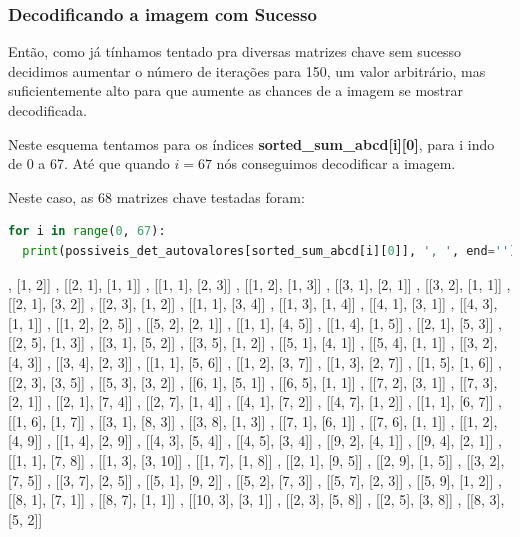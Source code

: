 \documentclass[a4paper, 12pt]{article}
\begin{document}
\subsubsection{Decodificando a imagem com Sucesso}

Então, como já tínhamos tentado pra diversas matrizes chave sem sucesso decidimos aumentar o número de iterações para 150, um valor arbitrário, mas suficientemente alto para que aumente as chances de a imagem se mostrar decodificada.

Neste esquema tentamos para os índices \textbf{sorted\_sum\_abcd[i][0]}, para i indo de 0 a 67. Até que quando $i=67$ nós conseguimos decodificar a imagem.

Neste caso, as 68 matrizes chave testadas foram:

\begin{lstlisting}[language=Python, caption = chamada do algorítimo de Arnold.]
for i in range(0, 67):
  print(possiveis_det_autovalores[sorted_sum_abcd[i][0]], ', ', end='')
\end{lstlisting}

\begin{footnotesize}
[[1, 1], [1, 2]] , [[2, 1], [1, 1]] , [[1, 1], [2, 3]] , [[1, 2], [1, 3]] , [[3, 1], [2, 1]] , [[3, 2], [1, 1]] , [[2, 1], [3, 2]] , [[2, 3], [1, 2]] , [[1, 1], [3, 4]] , [[1, 3], [1, 4]] , [[4, 1], [3, 1]] , [[4, 3], [1, 1]] , [[1, 2], [2, 5]] , [[5, 2], [2, 1]] , [[1, 1], [4, 5]] , [[1, 4], [1, 5]] , [[2, 1], [5, 3]] , [[2, 5], [1, 3]] , [[3, 1], [5, 2]] , [[3, 5], [1, 2]] , [[5, 1], [4, 1]] , [[5, 4], [1, 1]] , [[3, 2], [4, 3]] , [[3, 4], [2, 3]] , [[1, 1], [5, 6]] , [[1, 2], [3, 7]] , [[1, 3], [2, 7]] , [[1, 5], [1, 6]] , [[2, 3], [3, 5]] , [[5, 3], [3, 2]] , [[6, 1], [5, 1]] , [[6, 5], [1, 1]] , [[7, 2], [3, 1]] , [[7, 3], [2, 1]] , [[2, 1], [7, 4]] , [[2, 7], [1, 4]] , [[4, 1], [7, 2]] , [[4, 7], [1, 2]] , [[1, 1], [6, 7]] , [[1, 6], [1, 7]] , [[3, 1], [8, 3]] , [[3, 8], [1, 3]] , [[7, 1], [6, 1]] , [[7, 6], [1, 1]] , [[1, 2], [4, 9]] , [[1, 4], [2, 9]] , [[4, 3], [5, 4]] , [[4, 5], [3, 4]] , [[9, 2], [4, 1]] , [[9, 4], [2, 1]] , [[1, 1], [7, 8]] , [[1, 3], [3, 10]] , [[1, 7], [1, 8]] , [[2, 1], [9, 5]] , [[2, 9], [1, 5]] , [[3, 2], [7, 5]] , [[3, 7], [2, 5]] , [[5, 1], [9, 2]] , [[5, 2], [7, 3]] , [[5, 7], [2, 3]] , [[5, 9], [1, 2]] , [[8, 1], [7, 1]] , [[8, 7], [1, 1]] , [[10, 3], [3, 1]] , [[2, 3], [5, 8]] , [[2, 5], [3, 8]] , [[8, 3], [5, 2]]
\end{footnotesize}\\
\end{document}
